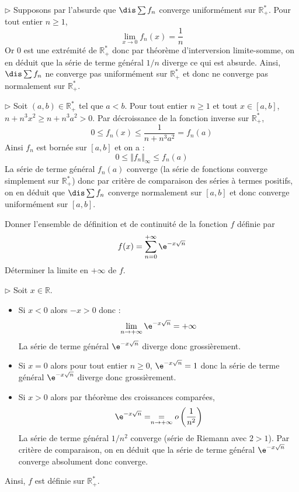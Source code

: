 \documentclass[a4paper,10pt]{report}
\begin{document}
\medskip

\noindent $\rhd$ Supposons par l'absurde que $\dis \sum f_n$ converge uniformément sur $\mathbb{R}_+^*$. Pour tout entier $n \geq 1$,
$$ \lim_{x \rightarrow 0} f_n(x) = \dfrac{1}{n}$$
Or $0$ est une extrémité de $\mathbb{R}_+^*$ donc par théorème d'interversion limite-somme, on en déduit que la série de terme général $1/n$ diverge ce qui est absurde. Ainsi, $\dis \sum f_n$ ne converge pas uniformément sur $\mathbb{R}_+^*$ et donc ne converge pas normalement sur $\mathbb{R}_+^*$.

\medskip

\noindent $\rhd$ Soit $(a,b) \in \mathbb{R}_+^*$ tel que $a<b$. Pour tout entier $n \geq 1$ et tout $x \in [a,b]$, $n+n^3x^2 \geq n+n^3a^2 >0$. Par décroissance de la fonction inverse sur $\mathbb{R}_+^*$,
$$ 0 \leq f_n(x) \leq \dfrac{1}{n+n^3a^2} = f_n(a)$$
Ainsi $f_n$ est bornée sur $[a,b]$ et on a :
$$ 0 \leq \Vert f_n \Vert_{\infty} \leq f_n(a)$$
La série de terme général $f_n(a)$ converge (la série de fonctions converge simplement sur $\mathbb{R}_+^*$) donc par critère de comparaison des séries à termes positifs, on en déduit que $\dis \sum f_n$ converge normalement sur $[a,b]$ et donc converge uniformément sur $[a,b]$.

\begin{Exa} Donner l'ensemble de définition et de continuité de la fonction $f$ définie par 
  \[
  f(x) = \sum_{n = 0}^{ + \infty} \e^{ - x\sqrt n}
  \]
 Déterminer la limite en $ + \infty$ de $f$.
 \end{Exa}
 
 
\corr 

\noindent $\rhd$ Soit $x \in \mathbb{R}$.
\begin{itemize}
\item Si $x<0$ alors $-x>0$ donc :
$$ \lim_{n \rightarrow + \infty} \e^{ - x\sqrt n} = + \infty$$
La série de terme général $\e^{ - x\sqrt n}$ diverge donc grossièrement.
\item Si $x=0$ alors pour tout entier $n \geq 0$, $\e^{ - x\sqrt n}=1$ donc la série de terme général $\e^{ - x\sqrt n}$ diverge donc grossièrement.
\item Si $x>0$ alors par théorème des croissances comparées,
$$ \e^{ - x\sqrt n} = \underset{n \rightarrow + \infty}{=} o \left( \dfrac{1}{n^2} \right)$$
La série de terme général $1/n^2$ converge (série de Riemann avec $2>1$). Par critère de comparaison, on en déduit que la série de terme général $ \e^{ - x\sqrt n} $ converge absolument donc converge.
\end{itemize}
Ainsi, $f$ est définie sur $\mathbb{R}_+^*$.
\end{document}
